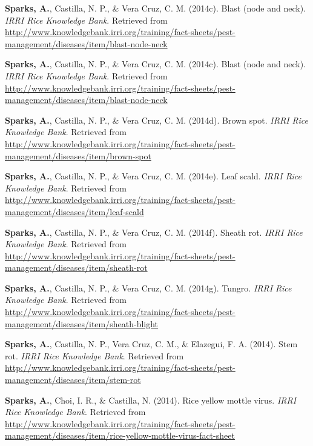 \documentclass[11pt, a4paper]{awesome-cv}
\begin{document}
\leavevmode\hypertarget{ref-Sparks2014c}{}%
\textbf{Sparks, A.}, Castilla, N. P., \& Vera Cruz, C. M. (2014c). Blast
(node and neck). \emph{{IRRI} Rice Knowledge Bank}. Retrieved from
\url{http://www.knowledgebank.irri.org/training/fact-sheets/pest-management/diseases/item/blast-node-neck}

\leavevmode\hypertarget{ref-Sparks2014c}{}%
\textbf{Sparks, A.}, Castilla, N. P., \& Vera Cruz, C. M. (2014c). Blast
(node and neck). \emph{{IRRI} Rice Knowledge Bank}. Retrieved from
\url{http://www.knowledgebank.irri.org/training/fact-sheets/pest-management/diseases/item/blast-node-neck}

\leavevmode\hypertarget{ref-Sparks2014a}{}%
\textbf{Sparks, A.}, Castilla, N. P., \& Vera Cruz, C. M. (2014d). Brown
spot. \emph{{IRRI} Rice Knowledge Bank}. Retrieved from
\url{http://www.knowledgebank.irri.org/training/fact-sheets/pest-management/diseases/item/brown-spot}

\leavevmode\hypertarget{ref-Sparks2014e}{}%
\textbf{Sparks, A.}, Castilla, N. P., \& Vera Cruz, C. M. (2014e). Leaf
scald. \emph{{IRRI} Rice Knowledge Bank}. Retrieved from
\url{http://www.knowledgebank.irri.org/training/fact-sheets/pest-management/diseases/item/leaf-scald}

\leavevmode\hypertarget{ref-Sparks2014g}{}%
\textbf{Sparks, A.}, Castilla, N. P., \& Vera Cruz, C. M. (2014f).
Sheath rot. \emph{{IRRI} Rice Knowledge Bank}. Retrieved from
\url{http://www.knowledgebank.irri.org/training/fact-sheets/pest-management/diseases/item/sheath-rot}

\leavevmode\hypertarget{ref-Sparks2014d}{}%
\textbf{Sparks, A.}, Castilla, N. P., \& Vera Cruz, C. M. (2014g).
Tungro. \emph{{IRRI} Rice Knowledge Bank}. Retrieved from
\url{http://www.knowledgebank.irri.org/training/fact-sheets/pest-management/diseases/item/sheath-blight}

\leavevmode\hypertarget{ref-Sparks2014h}{}%
\textbf{Sparks, A.}, Castilla, N. P., Vera Cruz, C. M., \& Elazegui, F.
A. (2014). Stem rot. \emph{{IRRI} Rice Knowledge Bank}. Retrieved from
\url{http://www.knowledgebank.irri.org/training/fact-sheets/pest-management/diseases/item/stem-rot}

\leavevmode\hypertarget{ref-Sparks2014i}{}%
\textbf{Sparks, A.}, Choi, I. R., \& Castilla, N. (2014). Rice yellow
mottle virus. \emph{{IRRI} Rice Knowledge Bank}. Retrieved from
\url{http://www.knowledgebank.irri.org/training/fact-sheets/pest-management/diseases/item/rice-yellow-mottle-virus-fact-sheet}
\end{document}
